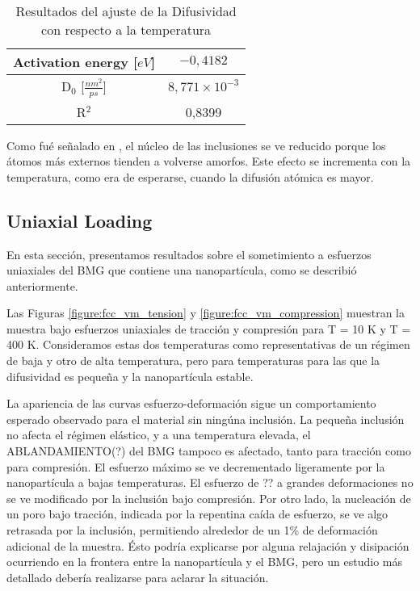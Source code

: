 \begin{table}[htp]
\caption{Resultados del ajuste de la Difusividad con respecto a la temperatura}
\begin{center}
\begin{tabular}{*{2}{c}}
\hline
Activation energy [$eV$]& $-0,4182$ \\
\hline
D$_{0}$ [$\frac{nm^{2}}{ps}$] & $8,771\times 10^{-3}$\\
\hline
R$^{2}$ & 0,8399 \\
\hline
\end{tabular}
\end{center}
\label{table:FCC_Diff_VS_T_Fit_Restults}
\end{table}

Como fué señalado en \cite{albe13}, el núcleo de las inclusiones se ve reducido porque los átomos más externos tienden a volverse amorfos. Este efecto se incrementa con la temperatura, como era de esperarse, cuando la difusión atómica es mayor.

\subsection{Uniaxial Loading}

En esta sección, presentamos resultados sobre el sometimiento a esfuerzos uniaxiales del BMG que contiene una nanopartícula, como se describió anteriormente.

Las Figuras \ref{figure:fcc_vm_tension} y \ref{figure:fcc_vm_compression} muestran la muestra bajo esfuerzos uniaxiales de tracción y compresión para T = 10 K y T = 400 K. Consideramos estas dos temperaturas como representativas de un régimen de baja y otro de alta temperatura, pero para temperaturas para las que la difusividad es pequeña y la nanopartícula estable.

La apariencia de las curvas esfuerzo-deformación sigue un comportamiento esperado observado para el material sin ningúna inclusión. La pequeña inclusión no afecta el régimen elástico, y a una temperatura elevada, el ABLANDAMIENTO(?) del BMG tampoco es afectado, tanto para tracción como para compresión. El esfuerzo máximo se ve decrementado ligeramente por la nanopartícula a bajas temperaturas. El esfuerzo de ?? a grandes deformaciones no se ve modificado por la inclusión bajo compresión. Por otro lado, la nucleación de un poro bajo tracción, indicada por la repentina caída de esfuerzo, se ve algo retrasada por la inclusión, permitiendo alrededor de un 1\% de deformación adicional de la muestra. Ésto podría explicarse por alguna relajación y disipación ocurriendo en la frontera entre la nanopartícula y el BMG, pero un estudio más detallado debería realizarse para aclarar la situación.

